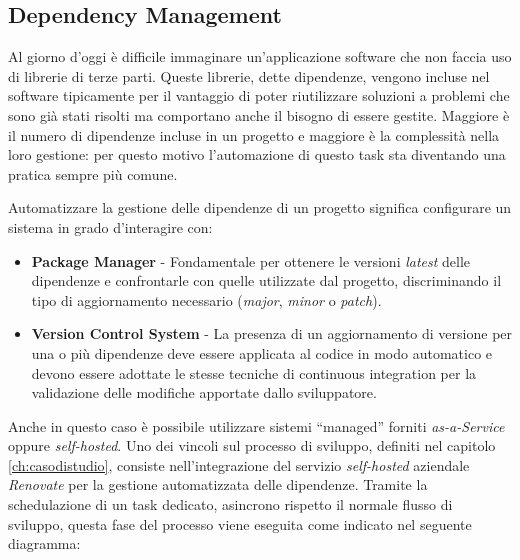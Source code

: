 \subsection{Dependency Management}
Al giorno d'oggi è difficile immaginare un'applicazione software che non faccia uso di librerie di terze parti.
Queste librerie, 
dette dipendenze, 
vengono incluse nel software tipicamente per il vantaggio di poter riutilizzare soluzioni a problemi che sono già stati risolti ma comportano anche il bisogno di essere gestite. 
Maggiore è il numero di dipendenze incluse in un progetto e maggiore è la complessità nella loro gestione: 
per questo motivo l’automazione di questo task sta diventando una pratica sempre più comune.

Automatizzare la gestione delle dipendenze di un progetto significa configurare un sistema in grado d'interagire con:

\begin{itemize}
    \item \textbf{Package Manager} - Fondamentale per ottenere le versioni \textit{latest} delle dipendenze e confrontarle con quelle utilizzate dal progetto, discriminando il tipo di aggiornamento necessario (\textit{major}, \textit{minor} o \textit{patch}).
    
    \item \textbf{Version Control System} - La presenza di un aggiornamento di versione per una o più dipendenze deve essere applicata al codice in modo automatico e devono essere adottate le stesse tecniche di continuous integration per la validazione delle modifiche apportate dallo sviluppatore.
\end{itemize}

Anche in questo caso è possibile utilizzare sistemi ``managed'' forniti \textit{as-a-Service} oppure \textit{self-hosted}. 
Uno dei vincoli sul processo di sviluppo,
definiti nel capitolo \ref{ch:casodistudio},
consiste nell'integrazione del servizio \textit{self-hosted} aziendale \textit{Renovate} per la gestione automatizzata delle dipendenze.
Tramite la schedulazione di un task dedicato, 
asincrono rispetto il normale flusso di sviluppo, 
questa fase del processo viene eseguita come indicato nel seguente diagramma:

